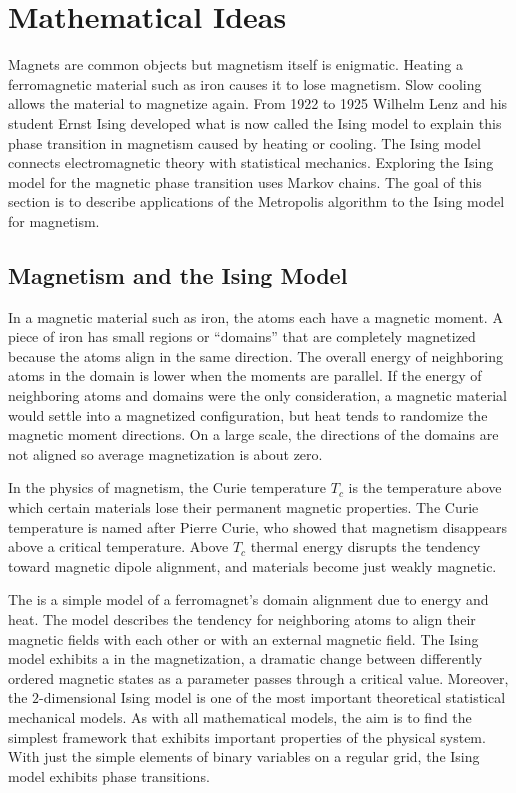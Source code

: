 \documentclass[12pt]{article}
\begin{document}
\section*{Mathematical Ideas}

Magnets are common objects but magnetism itself is enigmatic.  Heating a
ferromagnetic material such as iron causes it to lose magnetism.  Slow
cooling allows the material to magnetize again.  From 1922 to 1925
Wilhelm Lenz and his student Ernst Ising developed what is now called
the Ising model to explain this phase transition in magnetism caused by
heating or cooling.  The Ising model connects electromagnetic theory
with statistical mechanics.  Exploring the Ising model for the magnetic
phase transition uses Markov chains.  The goal of this section is to
describe applications of the Metropolis algorithm to the Ising model for
magnetism.

\subsection*{Magnetism and the Ising Model}

In a magnetic material such as iron, the atoms each have a magnetic
moment.  A piece of iron has small regions or ``domains'' that are
completely magnetized because the atoms align in the same direction. The
overall energy of neighboring atoms in the domain is lower when the
moments are parallel.  If the energy of neighboring atoms and domains
were the only consideration, a magnetic material would settle into a
magnetized configuration, but heat tends to randomize the magnetic
moment directions.  On a large scale, the directions of the domains are
not aligned so average magnetization is about zero.

In the physics of magnetism, the Curie temperature \( T_c \)%
is the temperature above which certain materials lose their permanent
magnetic properties.  The Curie temperature is named after Pierre Curie,
who showed that magnetism disappears above a critical temperature. Above
\( T_c \) thermal energy disrupts the tendency toward magnetic dipole
alignment, and materials become just weakly magnetic.

The %
is a simple model of a ferromagnet's domain alignment due to energy and
heat.  The model describes the tendency for neighboring atoms to align
their magnetic fields with each other or with an external magnetic
field.  The Ising model exhibits a %
in the magnetization, a dramatic change between differently ordered
magnetic states as a parameter passes through a critical value.
Moreover, the \( 2 \)-dimensional Ising model is one of the most
important theoretical statistical mechanical models.  As with all
mathematical models, the aim is to find the simplest framework that
exhibits important properties of the physical system.  With just the
simple elements of binary variables on a regular grid, the Ising model
exhibits phase transitions.
\end{document}
